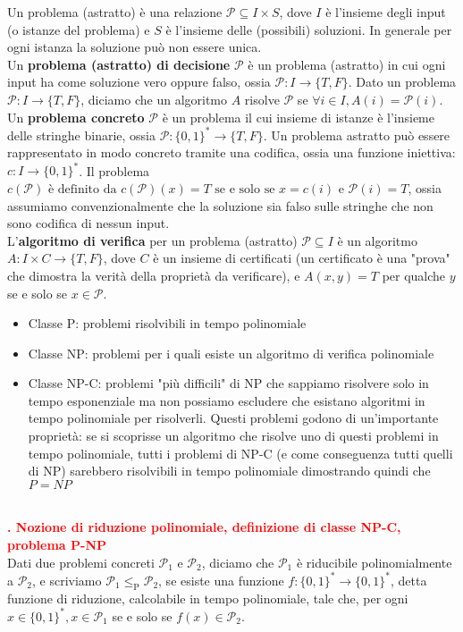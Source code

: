 \documentclass[12pt]{article}
\newcounter{questioncounter}
\newcommand{\question}[1]{
    \stepcounter{questioncounter}
    \textbf{\\\textcolor{red}{\arabic{questioncounter}. #1}}\\
}
\begin{document}
Un problema (astratto) è una relazione $\mathcal{P}\subseteq I\times S$, dove $I$ è l'insieme degli input (o istanze del problema) e $S$ è l'insieme delle (possibili) soluzioni. In generale per ogni istanza la soluzione può non essere unica.\\
Un \textbf{problema (astratto) di decisione} $\mathcal{P}$ è un problema (astratto) in cui ogni input ha come soluzione vero oppure falso, ossia $\mathcal{P}:I\rightarrow \{T,F\}$. Dato un problema $\mathcal{P}:I\rightarrow \{T,F\}$, diciamo che un algoritmo $A$ risolve $\mathcal{P}$ se $\forall i\in I, A(i)=\mathcal{P}(i)$.\\
Un \textbf{problema concreto} $\mathcal{P}$ è un problema il cui insieme di istanze è l'insieme delle stringhe binarie, ossia $\mathcal{P}:\{0,1\}^{*}\rightarrow \{T,F\}$. Un problema astratto può essere rappresentato in modo concreto tramite una codifica, ossia una funzione iniettiva: $c:I\rightarrow \{0,1\}^{*}$. Il problema $c(\mathcal{P}) \text{ è definito da } c(\mathcal{P})(x)=T \text{ se e solo se } x=c(i) \text{ e } \mathcal{P}(i)=T$, ossia assumiamo convenzionalmente che la soluzione sia falso sulle stringhe che non sono codifica di nessun input.\\
L'\textbf{algoritmo di verifica} per un problema (astratto) $\mathcal{P}\subseteq I$ è un algoritmo $A:I\times C\rightarrow\{T,F\}$, dove $C$ è un insieme di certificati (un certificato è una "prova" che dimostra la verità della proprietà da verificare), e $A(x,y)=T$ per qualche $y$ se e solo se $x\in \mathcal{P}$.\\
\begin{itemize}
    \item Classe P: problemi risolvibili in tempo polinomiale
    \item Classe NP: problemi per i quali esiste un algoritmo di verifica polinomiale
    \item Classe NP-C: problemi "più difficili" di NP che sappiamo risolvere solo in tempo esponenziale ma non possiamo escludere che esistano algoritmi in tempo polinomiale per risolverli. Questi problemi godono di un'importante proprietà: se si scoprisse un algoritmo che risolve uno di questi problemi in tempo polinomiale, tutti i problemi di NP-C (e come conseguenza tutti quelli di NP) sarebbero risolvibili in tempo polinomiale dimostrando quindi che $P=NP$
\end{itemize}
\question{Nozione di riduzione polinomiale, definizione di classe NP-C, problema P-NP}
Dati due problemi concreti $\mathcal{P}_{1} \text{ e } \mathcal{P}_{2}$, diciamo che $\mathcal{P}_{1}$ è riducibile polinomialmente a $\mathcal{P}_{2}$, e scriviamo $\mathcal{P}_{1}\leq_{\text{P}}\mathcal{P}_{2}$, se esiste una funzione $f:\{0,1\}^{*}\rightarrow\{0,1\}^{*}$, detta funzione di riduzione, calcolabile in tempo polinomiale, tale che, per ogni $x\in\{0,1\}^{*}, x\in\mathcal{P}_{1}$ se e solo se $f(x)\in\mathcal{P}_{2}$.\\
\end{document}
